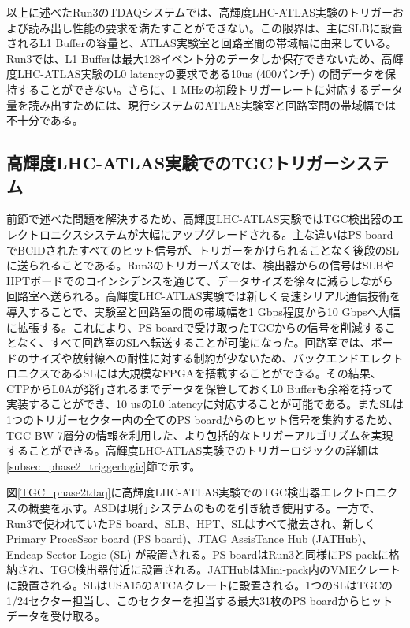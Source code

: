 以上に述べたRun3のTDAQシステムでは、高輝度LHC-ATLAS実験のトリガーおよび読み出し性能の要求を満たすことができない。この限界は、主にSLBに設置されるL1 Bufferの容量と、ATLAS実験室と回路室間の帯域幅に由来している。Run3では、L1 Bufferは最大128イベント分のデータしか保存できないため、高輝度LHC-ATLAS実験のL0 latencyの要求である10us  (400バンチ) の間データを保持することができない。さらに、1 MHzの初段トリガーレートに対応するデータ量を読み出すためには、現行システムのATLAS実験室と回路室間の帯域幅では不十分である。

    \subsection{高輝度LHC-ATLAS実験でのTGCトリガーシステム}  
前節で述べた問題を解決するため、高輝度LHC-ATLAS実験ではTGC検出器のエレクトロニクスシステムが大幅にアップグレードされる。主な違いはPS boardでBCIDされたすべてのヒット信号が、トリガーをかけられることなく後段のSLに送られることである。Run3のトリガーパスでは、検出器からの信号はSLBやHPTボードでのコインシデンスを通じて、データサイズを徐々に減らしながら回路室へ送られる。高輝度LHC-ATLAS実験では新しく高速シリアル通信技術を導入することで、実験室と回路室の間の帯域幅を1 Gbps程度から10 Gbpsへ大幅に拡張する。これにより、PS boardで受け取ったTGCからの信号を削減することなく、すべて回路室のSLへ転送することが可能になった。回路室では、ボードのサイズや放射線への耐性に対する制約が少ないため、バックエンドエレクトロニクスであるSLには大規模なFPGAを搭載することができる。その結果、CTPからL0Aが発行されるまでデータを保管しておくL0 Bufferも余裕を持って実装することができ、10 usのL0 latencyに対応することが可能である。またSLは1つのトリガーセクター内の全てのPS boardからのヒット信号を集約するため、TGC BW 7層分の情報を利用した、より包括的なトリガーアルゴリズムを実現することができる。高輝度LHC-ATLAS実験でのトリガーロジックの詳細は\ref{subsec_phase2_triggerlogic}節で示す。

図\ref{TGC_phase2tdaq}に高輝度LHC-ATLAS実験でのTGC検出器エレクトロニクスの概要を示す。ASDは現行システムのものを引き続き使用する。一方で、Run3で使われていたPS board、SLB、HPT、SLはすべて撤去され、新しくPrimary ProceSsor board  (PS board)、JTAG AssisTance Hub  (JATHub)、Endcap Sector Logic  (SL) が設置される。PS boardはRun3と同様にPS-packに格納され、TGC検出器付近に設置される。JATHubはMini-pack内のVMEクレートに設置される。SLはUSA15のATCAクレートに設置される。1つのSLはTGCの1/24セクター担当し、このセクターを担当する最大31枚のPS boardからヒットデータを受け取る。

